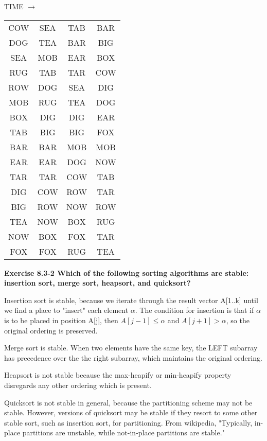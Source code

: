 \documentclass[10pt,fullpage]{article}
\begin{document}
TIME $\longrightarrow$\\
\begin{tabular}{|c|c|c|c|}
  \hline
  COW & SEA & TAB & BAR \\
  DOG & TEA & BAR & BIG \\
  SEA & MOB & EAR & BOX \\
  RUG & TAB & TAR & COW \\
  ROW & DOG & SEA & DIG \\
  MOB & RUG & TEA & DOG \\
  BOX & DIG & DIG & EAR \\
  TAB & BIG & BIG & FOX \\
  BAR & BAR & MOB & MOB \\
  EAR & EAR & DOG & NOW \\
  TAR & TAR & COW & TAB \\
  DIG & COW & ROW & TAR \\
  BIG & ROW & NOW & ROW \\
  TEA & NOW & BOX & RUG \\
  NOW & BOX & FOX & TAR \\
  FOX & FOX & RUG & TEA \\
  \hline
\end{tabular}



\newpage
\textbf{Exercise 8.3-2 Which of the following sorting algorithms
are stable: insertion sort, merge sort, heapsort, and quicksort?}

Insertion sort is stable, because we iterate through the result
vector A[1..k] until we find a place to "insert" each element
$\alpha$. The condition for insertion is that if $\alpha$ is to be
placed in position A[j], then $A[j-1] \leq \alpha$ and $A[j+1] >
\alpha$, so the original ordering is preserved.

Merge sort is stable. When two elements have the same key, the
LEFT subarray has precedence over the the right subarray, which
maintains the original ordering.

Heapsort is not stable because the max-heapify or min-heapify
property disregards any other ordering which is present.

Quicksort is not stable in general, because the partitioning
scheme may not be stable. However, versions of quicksort may be
stable if they resort to some other stable sort, such as insertion
sort, for partitioning. From wikipedia, "Typically, in-place
partitions are unstable, while not-in-place partitions are
stable."
\end{document}
